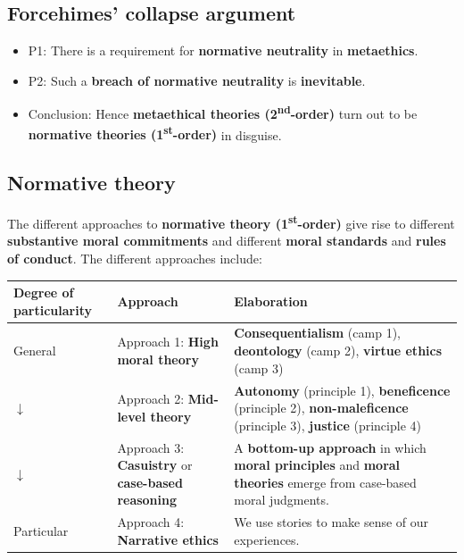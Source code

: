 \documentclass[11pt]{article}
\begin{document}
\subsection{Forcehimes' collapse argument}
\label{sec:org51246cb}
\begin{itemize}
\item P1: There is a requirement for \textbf{normative neutrality} in \textbf{metaethics}.
\item P2: Such a \textbf{breach of normative neutrality} is \textbf{inevitable}.
\item Conclusion: Hence \textbf{metaethical theories (2\textsuperscript{nd}-order)} turn out to be \textbf{normative theories (1\textsuperscript{st}-order)} in disguise.
\end{itemize}
\subsection{Normative theory}
\label{sec:org42a0325}
The different approaches to \textbf{normative theory (1\textsuperscript{st}-order)} give rise to different \textbf{substantive moral commitments} and different \textbf{moral standards} and \textbf{rules of conduct}. The different approaches include:

\begin{center}
\begin{tabularx}{\textwidth}{|X|X|X|}
\hline
Degree of particularity & Approach & Elaboration\\
\hline
General & Approach 1: \textbf{High moral theory} & \textbf{Consequentialism} (camp 1), \textbf{deontology} (camp 2), \textbf{virtue ethics} (camp 3)\\
\hline
\(\downarrow\) & Approach 2: \textbf{Mid-level theory} & \textbf{Autonomy} (principle 1), \textbf{beneficence} (principle 2), \textbf{non-maleficence} (principle 3), \textbf{justice} (principle 4)\\
\hline
\(\downarrow\) & Approach 3: \textbf{Casuistry} or \textbf{case-based reasoning} & A \textbf{bottom-up approach} in which \textbf{moral principles} and \textbf{moral theories} emerge from case-based moral judgments.\\
\hline
Particular & Approach 4: \textbf{Narrative ethics} & We use stories to make sense of our experiences.\\
\hline
\end{tabularx}
\end{center}
 \newpage
\end{document}
